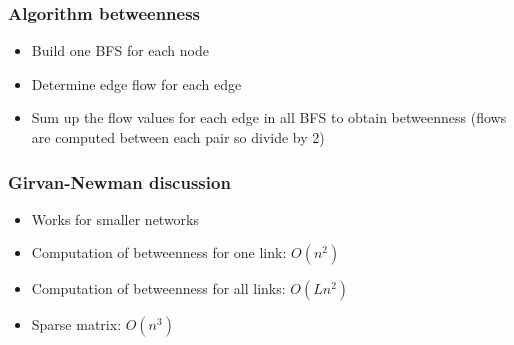 \subsubsection{Algorithm betweenness}
\begin{itemize}
\item Build one BFS for each node
\item Determine edge flow for each edge
\item Sum up the flow values for each edge in all BFS to obtain
  betweenness (flows are computed between each pair so divide by 2)
\end{itemize}

\subsubsection{Girvan-Newman discussion}
\begin{itemize}
\item Works for smaller networks
\item Computation of betweenness for one link: $ O(n^2) $
\item Computation of betweenness for all links: $ O (L n^2) $
\item Sparse matrix: $ O(n^3) $
\end{itemize}

